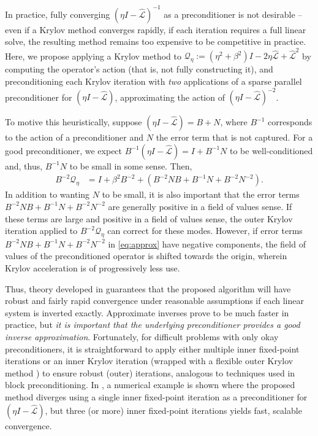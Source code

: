 \documentclass[review]{siamart}
\begin{document}
In practice, fully converging $(\eta I - \widehat{\mathcal{L}})^{-1}$ as a preconditioner
is not desirable --  even if a Krylov method converges rapidly, if each iteration requires
a full linear solve, the resulting method remains too expensive to be competitive in practice.
Here, we propose
applying a Krylov method to $\mathcal{Q}_\eta:=(\eta^2+\beta^2)I - 2\eta\widehat{\mathcal{L}} +
\widehat{\mathcal{L}}^2$ by computing the operator's action (that is, not fully constructing
it), and preconditioning each Krylov iteration with \textit{two} applications of a sparse
parallel preconditioner for $(\eta I - \widehat{\mathcal{L}})$, approximating the action
of $(\eta I - \widehat{\mathcal{L}})^{-2}$.

To motive this heuristically, suppose $(\eta I - \widehat{\mathcal{L}}) = B + N$,
where $B^{-1}$ corresponds to the action of a preconditioner and $N$ the error
term that is not captured. For a good preconditioner, we expect
$B^{-1}(\eta I - \widehat{\mathcal{L}}) = I+B^{-1}N$ to be
well-conditioned and, thus, $B^{-1}N$ to be small in some sense. Then,
%
\begin{align}\nonumber
B^{-2}\mathcal{Q}_\eta & = I + \beta^2B^{-2} + \left(B^{-2}NB + B^{-1}N + B^{-2}N^{-2}\right)\label{eq:approx}.
\end{align}
%
In addition to wanting $N$ to be small, it is also important that the error terms
$B^{-2}NB + B^{-1}N + B^{-2}N^{-2}$ are generally positive in a field of values sense.
If these terms are large and positive in a field of values sense, the outer Krylov
iteration applied to $B^{-2}\mathcal{Q}_\eta$ can correct for these modes. However,
if error terms $B^{-2}NB + B^{-1}N + B^{-2}N^{-2}$ in \eqref{eq:approx} have
negative components, the field of values of the preconditioned operator is shifted
towards the origin, wherein Krylov acceleration is of progressively less use.

Thus, theory developed in  guarantees that the proposed algorithm
will have robust and fairly rapid convergence under reasonable assumptions if each
linear system is inverted exactly. Approximate inverses prove to be much faster in
practice, but \textit{it is important that the underlying preconditioner provides a good
inverse approximation}. Fortunately, for difficult problems with only okay preconditioners,
it is straightforward to apply either multiple inner fixed-point iterations or an
inner Krylov iteration (wrapped with a flexible outer Krylov method
\cite{notay2000flexible,saad1993flexible}) to ensure robust (outer) iterations, analogous
to techniques used in block preconditioning. In , a
numerical example is shown where the proposed method diverges using a single inner
fixed-point iteration as a preconditioner for $(\eta I - \widehat{\mathcal{L}})$, but
three (or more) inner fixed-point iterations yields fast, scalable convergence.
\end{document}
